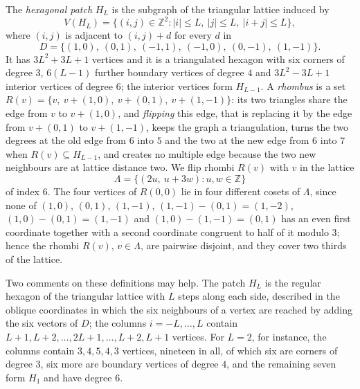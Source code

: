 \documentclass[12pt,a4paper]{article}%
\begin{document}


The \emph{hexagonal patch} $H_{L}$ is the subgraph of the triangular lattice induced by
\[
V(H_{L})=\{(i,j)\in \mathbb{Z}^{2}:\left\vert i\right\vert \leq L,\ \left\vert j\right\vert \leq L,\
\left\vert i+j\right\vert \leq L\},
\]
where $(i,j)$ is adjacent to $(i,j)+d$ for every $d$ in
\[
D=\{(1,0),\ (0,1),\ (-1,1),\ (-1,0),\ (0,-1),\ (1,-1)\}.
\]
It has $3L^{2}+3L+1$ vertices and it is a triangulated hexagon with six corners of degree $3$,
$6(L-1)$ further boundary vertices of degree $4$ and $3L^{2}-3L+1$ interior vertices of degree $6$;
the interior vertices form $H_{L-1}$. A \emph{rhombus} is a set
$R(v)=\{v,\ v+(1,0),\ v+(0,1),\ v+(1,-1)\}$: its two triangles share the edge from $v$ to $v+(1,0)$,
and \emph{flipping} this edge, that is replacing it by the edge from $v+(0,1)$ to $v+(1,-1)$, keeps
the graph a triangulation, turns the two degrees at the old edge from $6$ into $5$ and the two at
the new edge from $6$ into $7$ when $R(v)\subseteq H_{L-1}$, and creates no multiple edge because the
two new neighbours are at lattice distance two. We flip rhombi $R(v)$ with $v$ in the lattice
\[
\Lambda =\{(2u,\ u+3w):u,w\in \mathbb{Z}\}
\]
of index $6$. The four vertices of $R(0,0)$ lie in four different cosets of $\Lambda $, since none of
$(1,0)$, $(0,1)$, $(1,-1)$, $(1,-1)-(0,1)=(1,-2)$, $(1,0)-(0,1)=(1,-1)$ and $(1,0)-(1,-1)=(0,1)$ has
an even first coordinate together with a second coordinate congruent to half of it modulo $3$;
hence the rhombi $R(v)$, $v\in \Lambda $, are pairwise disjoint, and they cover two thirds of the
lattice.

Two comments on these definitions may help. The patch $H_{L}$ is the regular
hexagon of the triangular lattice with $L$ steps along each side, described in
the oblique coordinates in which the six neighbours of a vertex are reached by
adding the six vectors of $D$; the columns $i=-L,\ldots ,L$ contain
$L+1,L+2,\ldots ,2L+1,\ldots ,L+2,L+1$ vertices. For $L=2$, for instance, the
columns contain $3,4,5,4,3$ vertices, nineteen in all, of which six are corners
of degree $3$, six more are boundary vertices of degree $4$, and the remaining
seven form $H_{1}$ and have degree $6$.
\end{document}
